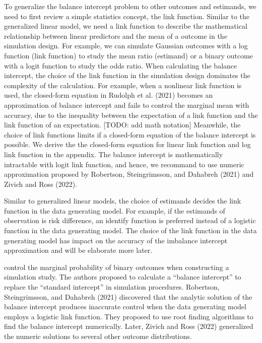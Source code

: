 \documentclass[
]{article}
\begin{document}
To generalize the balance intercept problem to other outcomes and
estimands, we need to first review a simple statistics concept, the link
function. Similar to the generalized linear model, we need a link
function to describe the mathematical relationship between linear
predictors and the mean of a outcome in the simulation design. For
example, we can simulate Gaussian outcomes with a log function (link
function) to study the mean ratio (estimand) or a binary outcome with a
logit function to study the odds ratio. When calculating the balance
intercept, the choice of the link function in the simulation design
dominates the complexity of the calculation. For example, when a
nonlinear link function is used, the closed-form equation in Rudolph et
al. (2021) becomes an approximation of balance intercept and fails to
control the marginal mean with accuracy, due to the inequality between
the expectation of a link function and the link function of an
expectation. {[}TODO: add math notation{]} Meanwhile, the choice of link
functions limits if a closed-form equation of the balance intercept is
possible. We derive the the closed-form equation for linear link
function and log link function in the appendix. The balance intercept is
mathematically intractable with logit link function, and hence, we
recommand to use numeric approximation proposed by Robertson,
Steingrimsson, and Dahabreh (2021) and Zivich and Ross (2022).

Similar to generalized linear models, the choice of estimands decides
the link function in the data generating model. For example, if the
estimands of observation is risk difference, an identify function is
preferred instead of a logistic function in the data generating model.
The choice of the link function in the data generating model has impact
on the accuracy of the imbalance intercept approximation and will be
elaborate more later.

control the marginal probability of binary outcomes when constructing a
simulation study. The authors proposed to calculate a ``balance
intercept'' to replace the ``standard intercept'' in simulation
procedures. Robertson, Steingrimsson, and Dahabreh (2021) discovered
that the analytic solution of the balance intercept produces inaccurate
control when the data generating model employs a logistic link function.
They proposed to use root finding algorithms to find the balance
intercept numerically. Later, Zivich and Ross (2022) generalized the
numeric solutions to several other outcome distributions.
\end{document}
